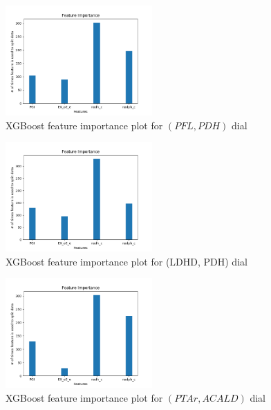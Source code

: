 \documentclass[12pt,chapterheads]{ucsd}
\begin{document}
\begin{figure}[h] 
\centering
\includegraphics[width=0.5\textwidth]{PFL_PDH_xgboost_no_params_important_features}
\caption[XGBoost feature importance plot for $(PFL, PDH)$ dial]
{XGBoost feature importance plot for $(PFL, PDH)$ dial}
\label{fig:PflPdhXgbImp}
\end{figure}

\begin{figure}[h] 
\centering
\includegraphics[width=0.5\textwidth]{LDH_D_PDH_xgboost_no_params_important_features}
\caption[XGBoost feature importance plot for \string(LDH\textunderscore D, PDH) dial]
{XGBoost feature importance plot for \string(LDH\textunderscore D, PDH) dial}
\label{fig:LdhPdhXgbImp}
\end{figure}

\begin{figure}[h] 
\centering
\includegraphics[width=0.5\textwidth]{PTAr_ACALD_xgboost_no_params_important_features}
\caption[XGBoost feature importance plot for $(PTAr, ACALD)$ dial]
{XGBoost feature importance plot for $(PTAr, ACALD)$ dial}
\label{fig:PtarAcaldXgbImp}
\end{figure}
\end{document}
